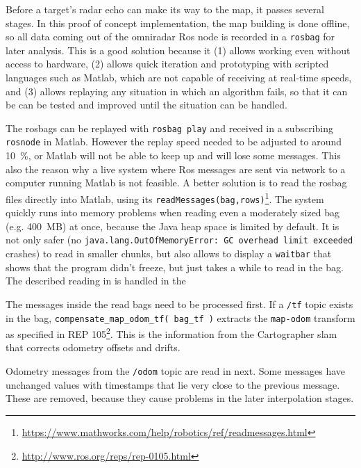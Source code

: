 Before a target's radar echo can make its way to the map, it passes several stages. In this proof of concept implementation, the map building is done offline, so all data coming out of the omniradar Ros node is recorded in a \texttt{rosbag} for later analysis. This is a good solution because it (1) allows working even without access to hardware, (2) allows quick iteration and prototyping with scripted languages such as Matlab, which are not capable of receiving at real-time speeds, and (3) allows replaying any situation in which an algorithm fails, so that it can be can be tested and improved until the situation can be handled.

The rosbags can be replayed with \texttt{rosbag play} and received in a subscribing \texttt{rosnode} in Matlab. However the replay speed needed to be adjusted to around \SI{10}{\%}, or Matlab will not be able to keep up and will lose some messages. This also the reason why a live system where Ros messages are sent via network to a computer running Matlab is not feasible. A better solution is to read the rosbag files directly into Matlab, using its \texttt{readMessages(bag,rows)}\footnote{\url{https://www.mathworks.com/help/robotics/ref/readmessages.html}}. The system quickly runs into memory problems when reading even a moderately sized bag (e.g. \SI{400}{MB}) at once, because the Java heap space is limited by default. It is not only safer (no \texttt{java.lang.OutOfMemoryError: GC overhead limit exceeded} crashes) to read in smaller chunks, but also allows to display a \texttt{waitbar} that shows that the program didn't freeze, but just takes a while to read in the bag. The described reading in is handled in the
\begin{Shaded}
\begin{Highlighting}[]
\end{Highlighting}
\end{Shaded}
The messages inside the read bags need to be processed first. If a \texttt{/tf} topic exists in the bag, \texttt{compensate\_map\_odom\_tf( bag\_tf )} extracts the \texttt{map-odom} transform as specified in REP 105\footnote{\url{http://www.ros.org/reps/rep-0105.html}}. This is the information from the Cartographer slam that corrects odometry offsets and drifts.

Odometry messages from the \texttt{/odom} topic are read in next. Some messages have unchanged values with timestamps that lie very close to the previous message. These are removed, because they cause problems in the later interpolation stages.

